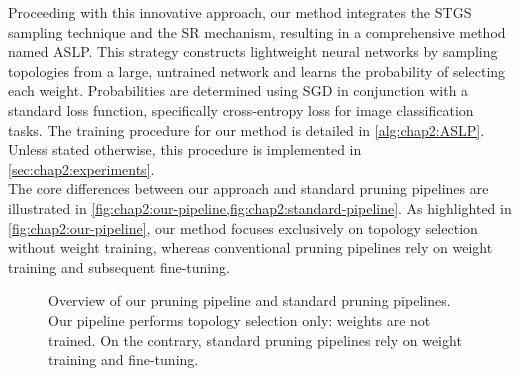 Proceeding with this innovative approach, our method integrates the \acl{STGS}
sampling technique and the \acl{SR} mechanism, resulting in a comprehensive
method named \acf{ASLP}. This strategy constructs lightweight neural networks by
sampling topologies from a large, untrained network and learns the probability
of selecting each weight. Probabilities are determined using \acl{SGD} in
conjunction with a standard loss function, specifically cross-entropy loss for
image classification tasks. The training procedure for our method is detailed in
\cref{alg:chap2:ASLP}. Unless stated otherwise, this procedure is implemented in
\cref{sec:chap2:experiments}.\\

The core differences between our approach and standard pruning pipelines are
illustrated in \cref{fig:chap2:our-pipeline,fig:chap2:standard-pipeline}. As
highlighted in \cref{fig:chap2:our-pipeline}, our method focuses exclusively on
topology selection without weight training, whereas conventional pruning
pipelines rely on weight training and subsequent fine-tuning.\\


\begin{figure}[htbp]
  \centering
  \vspace{0.10\textwidth}
  \caption{Overview of our pruning pipeline and standard pruning pipelines.
    Our pipeline performs topology selection only: weights are not trained.
    On the contrary, standard pruning pipelines rely on weight training and fine-tuning.}
\end{figure}


